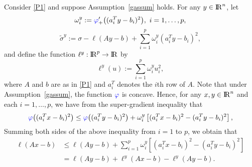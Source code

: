\documentclass[10pt]{article}
\numberwithin{equation}{section}
\def\R{{\rm I\!R}}
\begin{document}
Consider \eqref{P1} and suppose Assumption~\ref{gassum} holds. For any $y\in\R^n$, let
\begin{equation}\label{defomega}
\omega_i^y := {\color{blue} \varphi}_+'\big((a_i^T y - b_i)^2\big), ~i= 1,\ldots, p,
\end{equation}
\begin{equation}\label{defsigma}
\tilde{\sigma}^y := \sigma - \ell(Ay - b) + \sum_{i=1}^p \omega_i^y(a_i^Ty - b_i)^2,
\end{equation}
and define the function $\ell^y:\R^p\to \R$ by
\begin{equation}\label{defell}
\ell^y(u):= \sum_{i=1}^p \omega_i^yu_i^2,
\end{equation}
where $A$ and $b$ are as in \eqref{P1} and $a_i^T$ denotes the $i$th row of $A$.
Note that under Assumption~\ref{gassum}, the function ${\color{blue} \varphi}$ is concave. Hence, for any $x,y\in\R^n$ and each $i=1,\ldots,p$, we have from the super-gradient inequality that
\[
{\color{blue} \varphi}\big((a_i^T x - b_i)^2\big) \leq {\color{blue} \varphi}\big((a_i^T y - b_i)^2\big) + \omega_i^y\left[(a_i^T x - b_i)^2 -(a_i^T y - b_i)^2\right],
\]
Summing both sides of the above inequality from $i=1$ to $p$, we obtain that
\begin{equation}\label{ell}
\begin{aligned}
\ell(Ax - b) &\leq \ell(Ay - b) + \sum_{i=1}^p \omega_i^y\left[(a_i^T x - b_i)^2 -(a_i^T y - b_i)^2\right]\\
& = \ell(Ay - b) + \ell^y(Ax - b) - \ell^y(Ay-b).
\end{aligned}
\end{equation}
\end{document}
